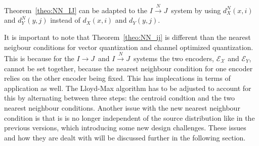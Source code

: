 \documentclass[10pt]{article}
\newcommand{\sysIJN}{\mbox{$I \overset{N}{\rightarrow} J$}}
\newcommand{\sysIJ}{\mbox{$I \rightarrow J$}}
\begin{document}
Theorem~\ref{theo:NN_IJ} can be adapted to the \sysIJN\ system by using $d_X^N(x,i)$ and $d_Y^N(y,j)$ instead of $d_X(x,i)$ and $d_Y(y,j)$.

It is important to note that Theorem~\ref{theo:NN_ij} is different than the nearest neigbour conditions for vector quantization and channel optimized quantization. This is because for the \sysIJ\ and \sysIJN\ systems the two encoders, $\mathcal{E_X}$ and $\mathcal{E}_Y$, cannot be set together, because the nearest neighbour condition for one encoder relies on the other encoder being fixed. This has implecations in terms of application as well. The Lloyd-Max algorithm has to be adjusted to account for this by alternating between three steps: the centroid condtion and the two nearest neighbour conditions. Another issue with the new nearest neighbour condition is that is is no longer independent of the source distribution like in the previous versions, which introducing some new design challenges. These issues and how they are dealt with will be discussed further in the following section.
\end{document}
